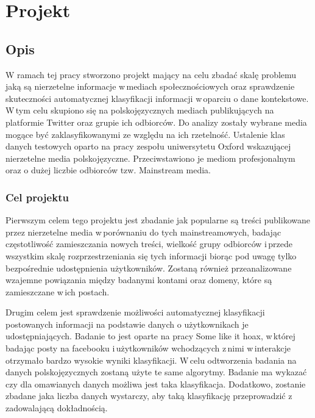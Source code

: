 \newpage
\section{Projekt}
\subsection{Opis}
W ramach tej pracy stworzono projekt mający na celu zbadać skalę problemu jaką są nierzetelne informacje w\,mediach społecznościowych oraz sprawdzenie skuteczności automatycznej klasyfikacji informacji w\,oparciu o dane kontekstowe.  W\,tym celu skupiono się na polskojęzycznych mediach publikujących na platformie Twitter oraz grupie ich odbiorców. Do analizy zostały wybrane media mogące być zaklasyfikowanymi ze względu na ich rzetelność. Ustalenie klas danych testowych oparto na pracy zespołu uniwersytetu Oxford wskazującej nierzetelne media polskojęzyczne. Przeciwstawiono je mediom profesjonalnym oraz o dużej liczbie odbiorców tzw. Mainstream media.
\subsubsection{Cel projektu}
Pierwszym celem tego projektu jest zbadanie jak popularne są treści publikowane przez nierzetelne media w\,porównaniu do tych mainstreamowych, badając częstotliwość zamieszczania nowych treści, wielkość grupy odbiorców i\,przede wszystkim skalę rozprzestrzeniania się tych informacji biorąc pod uwagę tylko bezpośrednie udostępnienia użytkowników. Zostaną również przeanalizowane wzajemne powiązania między badanymi kontami oraz domeny, które są zamieszczane w\,ich postach.
\par
Drugim celem jest sprawdzenie możliwości automatycznej klasyfikacji postowanych informacji na podstawie danych o użytkownikach je udostępniających. Badanie to jest oparte na pracy Some like it hoax, w\,której badając posty na facebooku i\,użytkowników wchodzących z\,nimi w\,interakcje otrzymało bardzo wysokie wyniki klasyfikacji. W\,celu odtworzenia badania na danych polskojęzycznych zostaną użyte te same algorytmy. Badanie ma wykazać czy dla omawianych danych możliwa jest taka klasyfikacja. Dodatkowo, zostanie zbadane jaka liczba danych wystarczy, aby taką klasyfikację przeprowadzić z\,zadowalającą dokładnością. 
